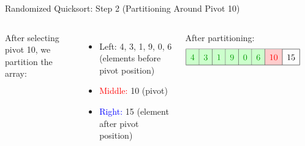 \begin{frame}{Randomized Quicksort: Step 2 (Partitioning Around Pivot 10)}
  \begin{columns}[t]
    After selecting pivot 10, we partition the array:
    \begin{itemize}
      \item \textcolor{green!60!black}{Left:} 4, 3, 1, 9, 0, 6 (elements before pivot position)
      \item \textcolor{red}{Middle:} 10 (pivot)
      \item \textcolor{blue}{Right:} 15 (element after pivot position)
    \end{itemize}
    \pause
    After partitioning:
    \[
      \renewcommand{\arraystretch}{1.5}
      \begin{array}{|c|c|c|c|c|c|c|c|}
        \hline
        \cellcolor{green!20}\textcolor{green!60!black}{4} & \cellcolor{green!20}\textcolor{green!60!black}{3} & \cellcolor{green!20}\textcolor{green!60!black}{1} & \cellcolor{green!20}\textcolor{green!60!black}{9} & \cellcolor{green!20}\textcolor{green!60!black}{0} & \cellcolor{green!20}\textcolor{green!60!black}{6} & \cellcolor{red!20}\textcolor{red}{10} & 15 \\
        \hline
      \end{array}
    \]
    \pause
    \begin{minipage}[t]{\linewidth}
      \vspace{0pt}
      \begin{center}
      \end{center}
    \end{minipage}
  \end{columns}
\end{frame}

